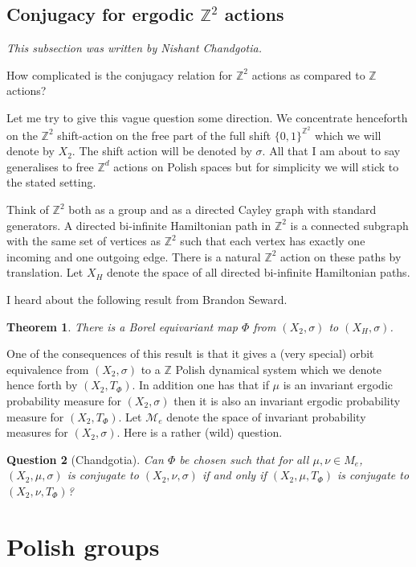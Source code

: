 \documentclass{article}
\newtheorem{theorem}{Theorem}[section]
\newtheorem{question}[theorem]{Question}
\theoremstyle{definition}
\newcommand{\Z}{\mathbb{Z}}
\begin{document}
 \subsection{Conjugacy for ergodic $\Z^2$ actions}
\textit{This subsection was written by Nishant Chandgotia. }

	How complicated is the conjugacy relation for $\Z^2$ actions as compared to $\Z$ actions?


Let me try to give this vague question some direction. We concentrate henceforth on the $\Z^2$ shift-action on the free part of the full shift $\{0,1\}^{\Z^2}$ which we will denote by $X_2$. The shift action will be denoted by $\sigma$. All that I am about to say generalises to free $\Z^d$ actions on Polish spaces but for simplicity we will stick to the stated setting. 

Think of $\Z^2$ both as a group and as a directed Cayley graph with standard generators. A directed bi-infinite Hamiltonian path in $\Z^2$ is a connected subgraph with the same set of vertices as $\Z^2$ such that each vertex has exactly one incoming and one outgoing edge. There is a natural $\Z^2$ action on these paths by translation. Let $X_H$ denote the space of all directed bi-infinite Hamiltonian paths.

I heard about the following result from Brandon Seward. 

\begin{theorem}\cite{gaotoappear} There is a Borel equivariant map $\Phi$ from $(X_2, \sigma)$ to $(X_H, \sigma)$.
	\end{theorem}

One of the consequences of this result is that it gives a (very special) orbit equivalence from $(X_2, \sigma)$ to a $\Z$ Polish dynamical system which we denote hence forth by $(X_2, T_\Phi)$. In addition one has that if $\mu$ is an invariant ergodic probability measure for $(X_2, \sigma)$ then it is also an invariant ergodic probability measure for $(X_2, T_\Phi)$. Let $\mathcal M_e$ denote the space of invariant probability measures for $(X_2,\sigma)$. Here is a rather (wild) question.

\begin{question}
[Chandgotia]
Can $\Phi$ be chosen such that for all $\mu, \nu\in M_e$, $(X_2, \mu, \sigma)$ is conjugate to $(X_2, \nu, \sigma)$ if and only if $(X_2, \mu, T_\Phi)$ is conjugate to $(X_2, \nu, T_\Phi)$?
\end{question}

\section{Polish groups}
\end{document}
